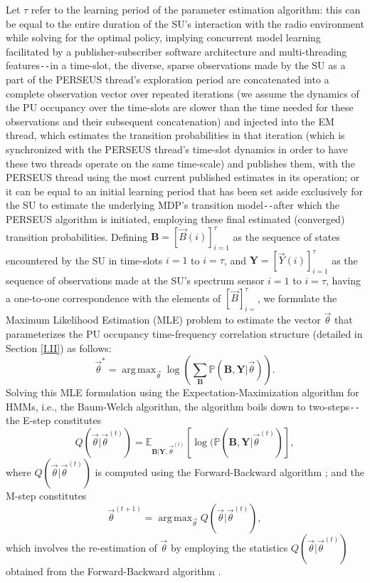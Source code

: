\documentclass[12pt, draftcls, onecolumn]{IEEEtran}
\DeclareMathOperator*{\argmax}{arg\,max}
\begin{document}
Let $\tau$ refer to the learning period of the parameter estimation algorithm: this can be equal to the entire duration of the SU's interaction with the radio environment while solving for the optimal policy, implying concurrent model learning facilitated by a publisher-subscriber software architecture and multi-threading features\texttt{-{}-}in a time-slot, the diverse, sparse observations made by the SU as a part of the PERSEUS thread's exploration period are concatenated into a complete observation vector over repeated iterations (we assume the dynamics of the PU occupancy over the time-slots are slower than the time needed for these observations and their subsequent concatenation) and injected into the EM thread, which estimates the transition probabilities in that iteration (which is synchronized with the PERSEUS thread's time-slot dynamics in order to have these two threads operate on the same time-scale) and publishes them, with the PERSEUS thread using the most current published estimates in its operation; or it can  be equal to an initial learning period that has been set aside exclusively for the SU to estimate the underlying MDP's transition model\texttt{-{}-}after which the PERSEUS algorithm is initiated, employing these final estimated (converged) transition probabilities. Defining $\mathbf{B}{=}[\vec{B}(i)]_{i{=}1}^{\tau}$ as the sequence of states encountered by the SU in time-slots $i{=}1$ to $i{=}\tau$, and $\mathbf{Y}{=}[\vec{Y}(i)]_{i{=}1}^{\tau}$ as the sequence of observations made at the SU's spectrum sensor $i{=}1$ to $i{=}\tau$, having a one-to-one correspondence with the elements of $[\vec{B}]_{i{=}}^{\tau}$, we formulate the Maximum Likelihood Estimation (MLE) problem to estimate the vector $\vec{\theta}$ that parameterizes the PU occupancy time-frequency correlation structure (detailed in Section \ref{I.II}) as follows:
\begin{equation}\label{19}
    \vec{\theta}^{*}=\argmax_{\vec{\theta}}\log{\left(\sum_{\mathbf{B}}\mathbb{P}(\mathbf{B},\mathbf{Y}|\vec{\theta})\right)}.
\end{equation}
Solving this MLE formulation using the Expectation-Maximization algorithm \cite{WCL:14} for HMMs, i.e., the Baum-Welch algorithm, the algorithm boils down to two-steps\texttt{-{}-}the E-step constitutes
\begin{equation}\label{20}
    Q(\vec{\theta}|\vec{\theta}^{(t)})=\mathbb{E}_{\mathbf{B}|\mathbf{Y},\vec{\theta}^{(t)}}\left[\log{(\mathbb{P}(\mathbf{B},\mathbf{Y}|\vec{\theta}^{(t)})}\right],
\end{equation}
where $Q(\vec{\theta}|\vec{\theta}^{(t)})$ is computed using the Forward-Backward algorithm \cite{WCL:14}; and the M-step constitutes
\begin{equation}\label{21}
    \vec{\theta}^{(t+1)}=\argmax_{\vec{\theta}}Q(\vec{\theta}|\vec{\theta}^{(t)}),
\end{equation}
which involves the re-estimation of $\vec{\theta}$ by employing the statistics $Q(\vec{\theta}|\vec{\theta}^{(t)})$ obtained from the Forward-Backward algorithm \cite{WCL:paper}.
\end{document}
